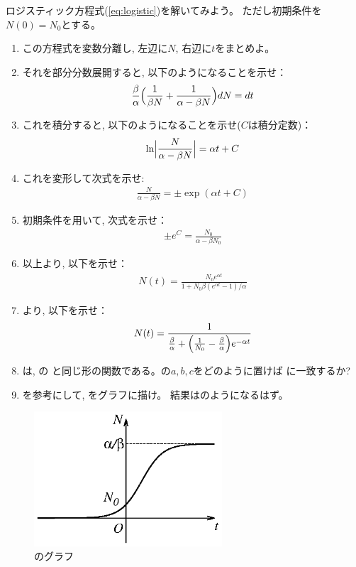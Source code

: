 \begin{q}\label{q:Logistic_solve} ロジスティック方程式(\ref{eq:logistic})を解いてみよう。
ただし初期条件を$N(0)=N_0$とする。
\begin{enumerate}
\item この方程式を変数分離し, 左辺に$N$, 右辺に$t$をまとめよ。
\item それを部分分数展開すると, 以下のようになることを示せ：
\begin{eqnarray}\frac{\beta}{\alpha}\Bigl(\frac{1}{\beta N} + \frac{1}{\alpha-\beta N}\Bigr)dN = dt\end{eqnarray}
\item これを積分すると, 以下のようになることを示せ($C$は積分定数)：
\begin{eqnarray}\ln\Bigl | \frac{N}{\alpha - \beta N}\Bigr |=\alpha t + C\end{eqnarray}
\item これを変形して次式を示せ:
\begin{eqnarray}\frac{N}{\alpha - \beta N}=\pm \exp(\alpha t+C)\end{eqnarray}
\item 初期条件を用いて, 次式を示せ：
\begin{eqnarray}\pm e^C=\frac{N_0}{\alpha - \beta N_0}\end{eqnarray}
\item 以上より, 以下を示せ：
\begin{eqnarray}
N(t)=\frac{N_0 e^{\alpha t}}{1 + N_0 \beta (e^{\alpha t} -1)/\alpha}\label{eq:Logistic_sol}
\end{eqnarray}
\item {}より, 以下を示せ：
\begin{eqnarray}
N(t)=\frac{1}{\frac{\beta}{\alpha} + \Bigl(\frac{1}{N_0}-\frac{\beta}{\alpha}\Bigr)e^{-\alpha t}}\label{eq:Logistic_sol2}
\end{eqnarray}
\item {}は, の
と同じ形の関数である。の$a, b, c$をどのように置けば
に一致するか?
\item {}を参考にして, をグラフに描け。
結果はのようになるはず。
\end{enumerate}\end{q}

\begin{figure}[h]
    \centering
    \includegraphics[width=7cm]{logistic_biol.eps}
    \caption{のグラフ}\label{fig:logistic_biol}
\end{figure}



